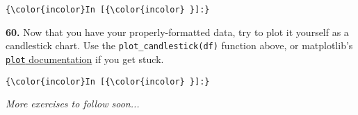 \documentclass[11pt]{article}
\begin{document}
    \begin{Verbatim}[commandchars=\\\{\}]
{\color{incolor}In [{\color{incolor} }]:} 
\end{Verbatim}


    \textbf{60.} Now that you have your properly-formatted data, try to plot
it yourself as a candlestick chart. Use the
\texttt{plot\_candlestick(df)} function above, or matplotlib's
\href{https://matplotlib.org/api/_as_gen/matplotlib.axes.Axes.plot.html}{\texttt{plot}
documentation} if you get stuck.

    \begin{Verbatim}[commandchars=\\\{\}]
{\color{incolor}In [{\color{incolor} }]:} 
\end{Verbatim}


    \emph{More exercises to follow soon...}


    
    
    
    
\end{document}

